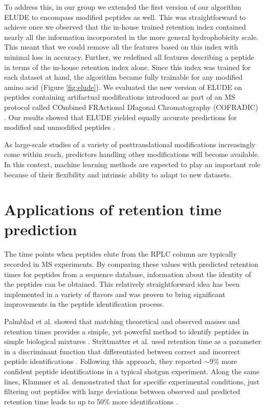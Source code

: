 \documentclass[a4paper]{article}
\begin{document}
To address this, in our group we extended the first version of our algorithm {\sc ELUDE} to encompass modified peptides as well. This was straightforward to achieve once we observed that the in-house trained  retention index contained nearly all the information incorporated in the more general hydrophobicity scale. This meant that we could remove all the features based on this index with minimal loss in accuracy. Further, we redefined all features describing a peptide in terms of the in-house retention index alone. Since this index was trained for each dataset at hand, the algorithm became fully trainable for any modified amino acid (Figure \ref{fig:elude}). We evaluated the new version of {\sc ELUDE} on peptides containing artifactual modifications introduced as part of an MS protocol called COmbined
FRActional DIagonal Chromatography (COFRADIC) \cite{Gevaert2002}. Our results showed that  {\sc ELUDE} yielded equally accurate predictions for modified and
unmodified peptides  \cite{elude2}.




As large-scale studies of a variety of posttranslational modifications
increasingly come within reach, predictors
handling other modifications will become available. In this context,
machine learning methods are expected to play an important role
because of their flexibility and intrinsic ability to adapt to new
datasets.


\section{\label{sec:app}Applications of retention time prediction}

The time points when peptides elute from the RPLC column are typically
recorded in MS experiments. By comparing these values with predicted
retention times for peptides from a sequence database, information
about the identity of the peptides can be obtained. This relatively
straightforward idea has been implemented in a variety of flavors and
was proven to bring significant improvements in the peptide
identification process.



Palmblad et al. showed that matching theoretical and observed masses
and retention times provides a simple, yet powerful method to identify
peptides in simple biological
mixtures \cite{palmblad2002prediction}. Strittmatter et al. used
retention time as a parameter in a discriminant function that
differentiated between correct and incorrect peptide
identifications \cite{Strittmatter2004}. Following this approach, they
reported $\sim$9\% more confident peptide identifications in a typical
shotgun experiment. Along the same lines, Klammer et al. demonstrated
that for specific experimental conditions, just filtering out peptides
with large deviations between observed and predicted retention time
leads to up to 50\% more
identifications \cite{klammer2007improving}. 
\end{document}
